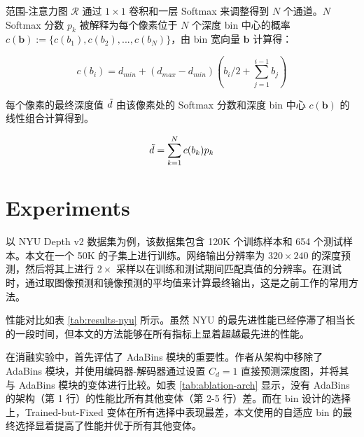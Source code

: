 \documentclass{vip-theme}
\begin{document}
范围-注意力图 $\mathcal{R}$ 通过 $1 \times 1$ 卷积和一层 Softmax 来调整得到 $N$ 个通道。$N$ Softmax 分数 $p_k$ 被解释为每个像素位于 $N$ 个深度 bin 中心的概率 $c(\textbf{b}) := \{c(b_1), c(b_2), ..., c(b_N)\}$，由 bin 宽向量 $\textbf{b}$ 计算得：

\begin{equation}
    c(b_i) =  d_{min} + (d_{max} - d_{min})(b_i/2 + \sum_{j=1}^{i-1} b_j)
\end{equation}

每个像素的最终深度值 $\Tilde{d}$ 由该像素处的 Softmax 分数和深度 bin 中心 $c(\textbf{b})$ 的线性组合计算得到。

\begin{equation}
    \Tilde{d} = \sum_{k=1}^N c(b_k) p_k
\end{equation}

\section{Experiments}
\label{experimentes}

以 NYU Depth v2 数据集为例，该数据集包含 120K 个训练样本和 654 个测试样本。本文在一个 50K 的子集上进行训练。网络输出分辨率为 $320 \times 240$ 的深度预测，然后将其上进行 $2 \times$ 采样以在训练和测试期间匹配真值的分辨率。在测试时，通过取图像预测和镜像预测的平均值来计算最终输出，这是之前工作的常用方法。

性能对比如表 \ref{tab:results-nyu} 所示。虽然 NYU 的最先进性能已经停滞了相当长的一段时间，但本文的方法能够在所有指标上显着超越最先进的性能。

在消融实验中，首先评估了 AdaBins 模块的重要性。作者从架构中移除了 AdaBins 模块，并使用编码器-解码器通过设置 $C_d=1$ 直接预测深度图，并将其与 AdaBins 模块的变体进行比较。如表 \ref{tab:ablation-arch} 显示，没有 AdaBins 的架构（第 1 行）的性能比所有其他变体（第 2-5 行）差。而在 bin 设计的选择上，Trained-but-Fixed 变体在所有选择中表现最差，本文使用的自适应 bin 的最终选择显着提高了性能并优于所有其他变体。
\end{document}
